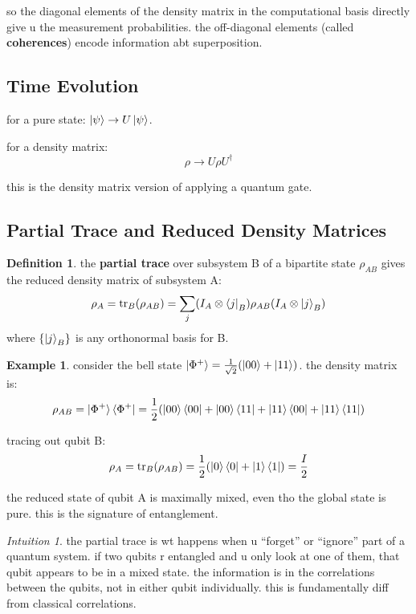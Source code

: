 \documentclass[11pt,a4paper]{article}
\theoremstyle{definition}
\newtheorem{definition}{Definition}[section]
\newtheorem{example}{Example}[section]
\theoremstyle{remark}
\newtheorem*{intuition}{Intuition}
\begin{document}
so the diagonal elements of the density matrix in the computational basis directly give u the measurement probabilities. the off-diagonal elements (called \textbf{coherences}) encode information abt superposition.

\subsection{Time Evolution}

for a pure state: $\ket{\psi} \to U\ket{\psi}$.

for a density matrix:
\[
\boxed{\rho \to U\rho U^\dagger}
\]

this is the density matrix version of applying a quantum gate.

\subsection{Partial Trace and Reduced Density Matrices}

\begin{definition}
the \textbf{partial trace} over subsystem B of a bipartite state $\rho_{AB}$ gives the reduced density matrix of subsystem A:
\[
\rho_A = \text{tr}_B(\rho_{AB}) = \sum_j (I_A \otimes \bra{j}_B) \rho_{AB} (I_A \otimes \ket{j}_B)
\]
where $\{\ket{j}_B\}$ is any orthonormal basis for B.
\end{definition}

\begin{example}
consider the bell state $\ket{\Phi^+} = \frac{1}{\sqrt{2}}(\ket{00} + \ket{11})$. the density matrix is:
\[
\rho_{AB} = \ket{\Phi^+}\bra{\Phi^+} = \frac{1}{2}(\ket{00}\bra{00} + \ket{00}\bra{11} + \ket{11}\bra{00} + \ket{11}\bra{11})
\]

tracing out qubit B:
\[
\rho_A = \text{tr}_B(\rho_{AB}) = \frac{1}{2}(\ket{0}\bra{0} + \ket{1}\bra{1}) = \frac{I}{2}
\]

the reduced state of qubit A is maximally mixed, even tho the global state is pure. this is the signature of entanglement.
\end{example}

\begin{intuition}
the partial trace is wt happens when u ``forget'' or ``ignore'' part of a quantum system. if two qubits r entangled and u only look at one of them, that qubit appears to be in a mixed state. the information is in the correlations between the qubits, not in either qubit individually. this is fundamentally diff from classical correlations.
\end{intuition}
\end{document}
